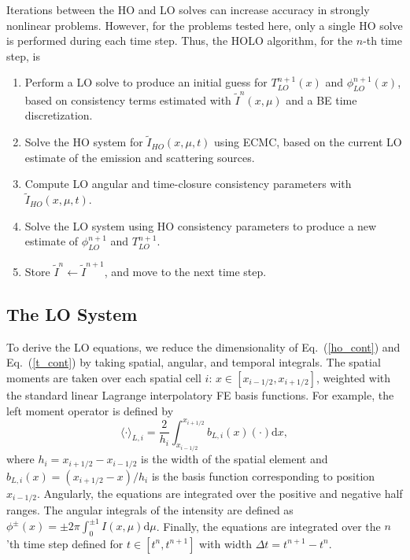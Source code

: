 \documentclass{anstrans}
\renewcommand{\eqref}[1]{(\ref{#1})}
\renewcommand{\d}{\mathrm{d}}
\newcommand{\mom}[1]{\langle #1 \rangle}
\newcommand{\xr}{{x_{i+1/2}}}
\begin{document}
Iterations between the HO and LO solves can increase accuracy in strongly nonlinear
problems. However, for the problems tested here, only a single HO solve is performed during each
time step.  Thus, the HOLO algorithm, for the $n$-th time step, is
\begin{enumerate}
    \item Perform a LO solve to produce an initial guess for $T_{LO}^{n+1}(x)$
        and $\phi_{LO}^{n+1}(x)$, based on consistency terms estimated with
        $\tilde{I}^{n}(x,\mu)$ and a BE time
    discretization.
\item Solve the HO system for $\tilde{I}_{HO}(x,\mu,t)$ using ECMC, based on the current
    LO estimate of the emission and scattering sources.%
\item Compute LO angular and time-closure consistency parameters with
    $\tilde{I}_{HO}(x,\mu,t)$.  
\item Solve the LO system using HO consistency parameters to produce a new
    estimate of $\phi^{n+1}_{LO}$ and $T^{n+1}_{LO}$.
\item Store $\tilde{I}^{n}\leftarrow\tilde{I}^{n+1}$, and move to the next time step.
\end{enumerate}

\subsection*{The LO System}
\label{sec:lo}

To derive the LO equations, we reduce the dimensionality of Eq.~\eqref{ho_cont} and
Eq.~\eqref{t_cont} by taking spatial, angular, and
temporal integrals.  The spatial moments are taken over each spatial cell $i$:
$x\in[x_{i-1/2},x_{i+1/2}]$, weighted with the standard linear Lagrange interpolatory FE basis functions.  For example, the left moment operator is defined by
\begin{equation}\label{x_mom}
    \mom{\cdot}_{L,i} = \frac{2}{h_i} \int_{x_{i-1/2}}^{\xr} b_{L,i}(x) (\cdot) \d x,
\end{equation}
where $h_i=x_{i+1/2}-x_{i-1/2}$ is the width of the spatial element and
$b_{L,i}(x)=(x_{i+1/2}-x)/h_i$ is the basis function corresponding to position
$x_{i-1/2}$. Angularly, the equations are integrated over the positive and negative half
ranges.  The angular integrals of the intensity are defined as $\phi^\pm(x) = \pm2\pi
\int_0^{\pm 1} I(x,\mu) \d \mu$.  Finally, the equations are integrated over the $n$'th
time step defined for 
$t\in[t^n,t^{n+1}]$ with width $\Delta t = t^{n+1}-t^{n}$.  
\end{document}
